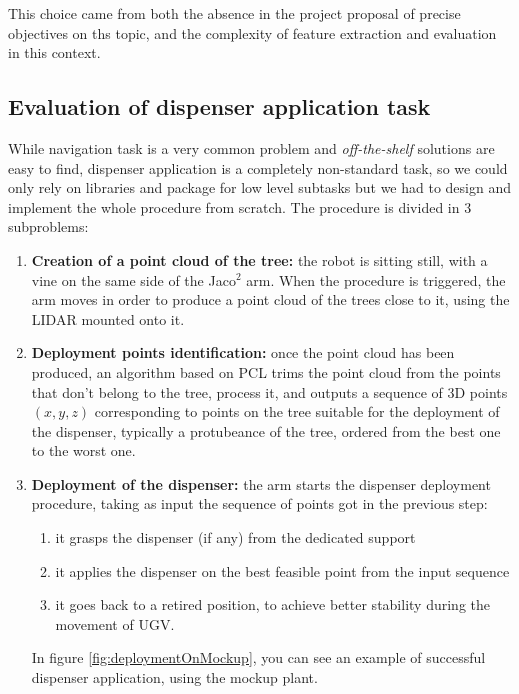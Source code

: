 This choice came from both the absence in the project proposal of precise objectives on ths topic, and the complexity of feature extraction and evaluation in this context.

\subsection{Evaluation of dispenser application task}
 While navigation task is a very common problem and \textit{off-the-shelf} solutions are easy to find, dispenser application is a completely non-standard task, so we could only rely on libraries and package for low level subtasks but we had to design and implement the whole procedure from scratch. The procedure is divided in 3 subproblems:
 \begin{enumerate}
 	\item \textbf{Creation of a point cloud of the tree:} the robot is sitting still, with a vine on the same side of the Jaco$^2$ arm. When the procedure is triggered, the arm moves in order to produce a point cloud of the trees close to it, using the \ac{LIDAR} mounted onto it. 
 	\item \textbf{Deployment points identification:} once the point cloud has been produced, an algorithm based on \ac{PCL} trims the point cloud from the points that don't belong to the tree, process it, and outputs a sequence of 3D points $(x,y,z)$ corresponding to points on the tree suitable for the deployment of the dispenser, typically a protubeance of the tree, ordered from the best one to the worst one.
 	\item \textbf{Deployment of the dispenser:} the arm starts the dispenser deployment procedure, taking as input the sequence of points got in the previous step:
 	\begin{enumerate}
 		\item it grasps the dispenser (if any) from the dedicated support
 		\item it applies the dispenser on the best feasible point from the input sequence
 		\item it goes back to a retired position, to achieve better stability during the movement of \ac{UGV}.
 	\end{enumerate}
 	In figure \ref{fig:deploymentOnMockup}, you can see an example of successful dispenser application, using the mockup plant.
 \end{enumerate}

